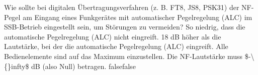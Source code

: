     {Wie sollte bei digitalen Übertragungsverfahren (z. B. FT8, JS8, PSK31) der NF-Pegel am Eingang eines Funkgerätes mit automatischer Pegelregelung (ALC) im SSB-Betrieb eingestellt sein, um Störungen zu vermeiden?}
    {So niedrig, dass die automatische Pegelregelung (ALC) nicht eingreift.}
    {18 dB höher als die Lautstärke, bei der die automatische Pegelregelung (ALC) eingreift.}
    {Alle Bedienelemente sind auf das Maximum einzustellen.}
    {Die NF-Lautstärke muss \$-\textbackslash\{\}infty\$ dB (also Null) betragen.}
    {false}{false}